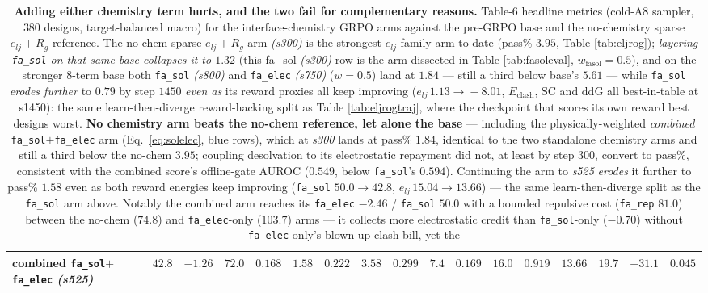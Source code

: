 \documentclass[11pt]{article}
\newcommand{\ttk}[1]{\texttt{\small #1}}
\begin{document}
\begin{table}[htbp]
{{\begin{tabular}{@{}>{\raggedright\arraybackslash}p{4.5cm}*{16}{c}@{}}
\rowcolor{dTint}combined \ttk{fa\_sol}${+}$\ttk{fa\_elec} \emph{(s525)} & $42.8$ & $-1.26$ & $72.0$ & $0.168$ & $1.58$ & $0.222$ & $3.58$ & $0.299$ & $7.4$ & $0.169$ & $16.0$ & $0.919$ & $13.66$ & $19.7$ & $-31.1$ & $0.045$\\
\bottomrule
\end{tabular}}}
\caption{\textbf{Adding either chemistry term hurts, and the two fail for complementary reasons.}
Table-6 headline metrics (cold-A8 sampler, $380$ designs, target-balanced macro) for the
interface-chemistry GRPO arms against the pre-GRPO base and the no-chemistry sparse $e_{lj}{+}R_g$
reference. The no-chem sparse $e_{lj}{+}R_g$ arm \emph{(s300)} is the strongest $e_{lj}$-family arm
to date (pass\% $3.95$, Table \ref{tab:eljrog}); \emph{layering \ttk{fa\_sol} on that same base
collapses it to $1.32$} (this fa\_sol \emph{(s300)} row is the arm dissected in
Table \ref{tab:fasoleval}, $w_{\mathrm{fasol}}{=}0.5$), and on the stronger $8$-term base both
\ttk{fa\_sol} \emph{(s800)} and \ttk{fa\_elec} \emph{(s750)} ($w{=}0.5$) land at $1.84$ --- still a
third below base's $5.61$ --- while \ttk{fa\_sol} \emph{erodes further} to $0.79$ by step $1450$
\emph{even as} its reward proxies all keep improving ($e_{lj}\,1.13\!\to\!{-}8.01$, $E_{\mathrm{clash}}$,
SC and ddG all best-in-table at s1450): the same learn-then-diverge reward-hacking split as
Table \ref{tab:eljrogtraj}, where the checkpoint that scores its own reward best designs worst.
\textbf{No chemistry arm beats the no-chem reference, let alone the base} --- including the
physically-weighted \emph{combined} \ttk{fa\_sol}${+}$\ttk{fa\_elec} arm (Eq.\ \ref{eq:solelec},
blue rows), which at \emph{s300} lands at pass\% $1.84$, identical to the two standalone chemistry arms
and still a third below the no-chem $3.95$; coupling desolvation to its electrostatic repayment did
not, at least by step $300$, convert to pass\%, consistent with the combined score's offline-gate
AUROC ($0.549$, below \ttk{fa\_sol}'s $0.594$). Continuing the arm to \emph{s525} \emph{erodes} it
further to pass\% $1.58$ even as both reward energies keep improving (\ttk{fa\_sol}
$50.0\!\to\!42.8$, $e_{lj}\,15.04\!\to\!13.66$) --- the same learn-then-diverge split as the
\ttk{fa\_sol} arm above. Notably the combined arm reaches its
\ttk{fa\_elec} ${-}2.46$ / \ttk{fa\_sol} $50.0$ with a bounded repulsive cost (\ttk{fa\_rep} $81.0$)
between the no-chem ($74.8$) and \ttk{fa\_elec}-only ($103.7$) arms --- it collects more electrostatic
credit than \ttk{fa\_sol}-only ($-0.70$) without \ttk{fa\_elec}-only's blown-up clash bill, yet the
}
\end{table}
\end{document}
